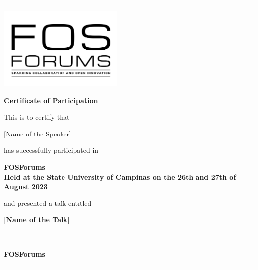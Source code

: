 \documentclass[12pt,a4paper]{article}
\newcommand{\border}{
  \begin{center}
    \color{mypurple}
    \rule{\textwidth}{2px}
  \end{center}
}
\begin{document}
\pagestyle{empty}

\border

\begin{center}
  \includegraphics[width=6cm]{fosforums.png}
  
  {\LARGE \bfseries Certificate of Participation}
\end{center}

\vspace{0.5cm}

\begin{center}
  This is to certify that
  
  \vspace{0.5cm}
 
  {\Large \calligra \textcolor{mypurple}{[Name of the Speaker]}} %
  
  \vspace{0.5cm}
  
  has successfully participated in
  
  \vspace{0.5cm}

  {\Large \bfseries FOSForums} \\ %
  \vspace{0.5cm}
  {\small \bfseries Held at the State University of Campinas on the 26th and 27th of August 2023} %

  \vspace{0.5cm}

  and presented a talk entitled

  \vspace{0.5cm}

  {\small \bfseries [Name of the Talk]} %

\end{center}

\vspace{1cm}

\begin{center}
    \vspace{0.5cm}
    
    \rule{6cm}{0.4pt} \\
    \textbf{FOSForums}
  \end{center}

\border
\end{document}

